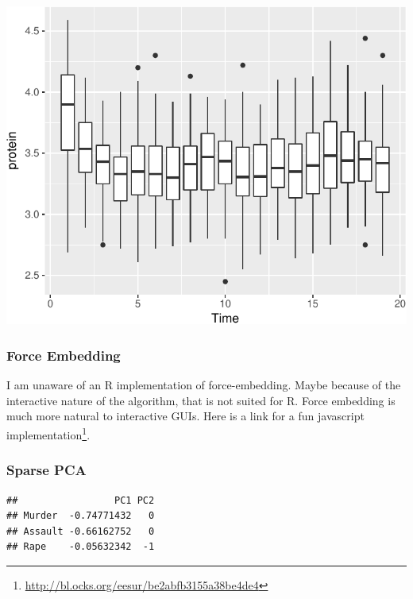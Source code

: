 \documentclass[]{book}
\newenvironment{Shaded}{\begin{snugshade}}{\end{snugshade}}
\newcommand{\CommentTok}[1]{\textcolor[rgb]{0.56,0.35,0.01}{\textit{#1}}}
\newcommand{\DataTypeTok}[1]{\textcolor[rgb]{0.13,0.29,0.53}{#1}}
\newcommand{\DecValTok}[1]{\textcolor[rgb]{0.00,0.00,0.81}{#1}}
\newcommand{\FloatTok}[1]{\textcolor[rgb]{0.00,0.00,0.81}{#1}}
\newcommand{\KeywordTok}[1]{\textcolor[rgb]{0.13,0.29,0.53}{\textbf{#1}}}
\newcommand{\NormalTok}[1]{#1}
\newcommand{\OperatorTok}[1]{\textcolor[rgb]{0.81,0.36,0.00}{\textbf{#1}}}
\newcommand{\OtherTok}[1]{\textcolor[rgb]{0.56,0.35,0.01}{#1}}
\newcommand{\StringTok}[1]{\textcolor[rgb]{0.31,0.60,0.02}{#1}}
\renewcommand{\href}[2]{#2\footnote{\url{#1}}}
\theoremstyle{definition}
\theoremstyle{definition}
\theoremstyle{definition}
\theoremstyle{remark}
\begin{document}
\includegraphics[width=0.5\linewidth]{Rcourse_files/figure-latex/unnamed-chunk-241-1}

\hypertarget{force-embedding}{%
\subsubsection{Force Embedding}\label{force-embedding}}

I am unaware of an R implementation of force-embedding.
Maybe because of the interactive nature of the algorithm, that is not suited for R.
Force embedding is much more natural to interactive GUIs.
Here is a link for a fun \href{http://bl.ocks.org/eesur/be2abfb3155a38be4de4}{javascript implementation}.

\hypertarget{sparse-pca}{%
\subsubsection{Sparse PCA}\label{sparse-pca}}

\begin{Shaded}
\end{Shaded}

\begin{verbatim}
##                 PC1 PC2
## Murder  -0.74771432   0
## Assault -0.66162752   0
## Rape    -0.05632342  -1
\end{verbatim}
\end{document}
